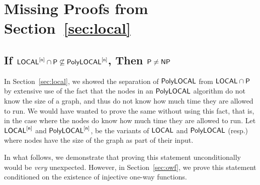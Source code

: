 \section{Missing Proofs from Section~\ref{sec:local}}
\label{app:local}
\subsection{If ${\mathsf{LOCAL}}^{[\mathsf{n}]} \cap {\mathsf{P}} \not \subseteq \mathsf{PolyLOCAL}^{[\mathsf{n}]}$, Then ${\mathsf{P}} \neq {\mathsf{NP}}$}
In Section~\ref{sec:local}, we showed the separation of ${\mathsf{PolyLOCAL}}$ from ${\mathsf{LOCAL}}\cap {\mathsf{P}}$ by extensive use of the fact that the nodes in an ${\mathsf{PolyLOCAL}}$ algorithm do not know the size of a graph, and thus do not know how much time they are allowed to run. We would have wanted to prove the same without using this fact, that is, in the case where the nodes do know how much time they are allowed to run. Let ${\mathsf{LOCAL}}^{[\mathsf{n}]}$ and $\mathsf{PolyLOCAL}^{[\mathsf{n}]}$, be the variants of ${\mathsf{LOCAL}}$ and ${\mathsf{PolyLOCAL}}$ (resp.) where nodes have the size of the graph as part of their input.

In what follows, we demonstrate that proving this statement unconditionally would be \emph{very} unexpected. However, in Section~\ref{sec:owf}, we prove this statement conditioned on the existence of injective one-way functions.


